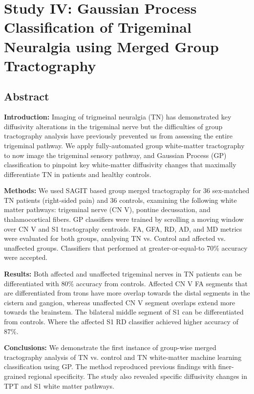 \graphicspath{{images/tn-gp-sagit/drafts/}}

\chapter{Study IV: Gaussian Process Classification of Trigeminal Neuralgia using Merged Group Tractography}
\label{section:study4}

\section{Abstract}
\textbf{Introduction:}  Imaging of trigmeinal neuralgia (TN) has demonstrated key diffusivity alterations in the trigeminal nerve but the difficulties of group tractography analysis have previously prevented us from assessing the entire trigeminal pathway. We apply fully-automated group white-matter tractography to now image the trigeminal sensory pathway, and Gaussian Process (GP) classification to pinpoint key white-matter diffusivity changes that maximally differentiate TN in patients and healthy controls. 

\textbf{Methods:} We used SAGIT based group merged tractography for 36 sex-matched TN patients (right-sided pain) and 36 controls, examining the following white matter pathways: trigeminal nerve (CN V), pontine decussation, and thalamocortical fibers. GP classifiers were trained by scrolling a moving window over CN V and S1 tractography centroids. FA, GFA, RD, AD, and MD metrics were evaluated for both groups, analysing TN vs. Control and affected vs. unaffected groups. Classifiers that performed at greater-or-equal-to 70\% accuracy were accepted.

\textbf{Results:} Both affected and unaffected trigeminal nerves in TN patients can be differentiated with 80\% accuracy from controls. Affected CN V FA segments that are differentiated from trons have more overlap towards the distal segments in the cistern and gangion, whereas unaffected CN V segment overlaps extend more towards the brainstem. The bilateral middle segment of S1 can be differentiated from controls. Where the affected S1 RD classifier achieved higher accuracy of 87\%.

\textbf{Conclusions:} We  demonstrate the first instance of group-wise merged tractography analysis of TN vs. control and TN white-matter machine learning classification using GP. The method reproduced previous findings with finer-grained regional specificity. The study also revealed specific diffusivity changes in TPT and S1 white matter pathways.

